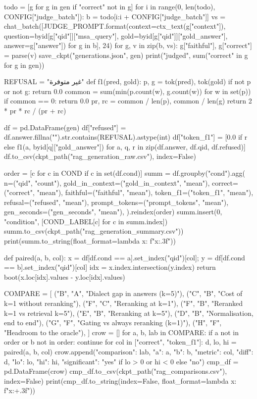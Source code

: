 {todo = [g for g in gen if "correct" not in g]
for i in range(0, len(todo), CONFIG["judge_batch"]):
    b = todo[i:i + CONFIG["judge_batch"]]
    vs = chat_batch([JUDGE_PROMPT.format(context=ctx_text(g["context"]), question=byid[g["qid"]]["msa_query"],
                                         gold=byid[g["qid"]]["gold_answer"], answer=g["answer"]) for g in b], 24)
    for g, v in zip(b, vs):
        g["faithful"], g["correct"] = parse(v)
    save_ckpt("generations.json", gen)
print("judged", sum("correct" in g for g in gen))

REFUSAL = "غير متوفرة"
def f1(pred, gold):
    p, g = tok(pred), tok(gold)
    if not p or not g:
        return 0.0
    common = sum(min(p.count(w), g.count(w)) for w in set(p))
    if common == 0:
        return 0.0
    pr, rc = common / len(p), common / len(g)
    return 2 * pr * rc / (pr + rc)

df = pd.DataFrame(gen)
df["refused"] = df.answer.fillna("").str.contains(REFUSAL).astype(int)
df["token_f1"] = [0.0 if r else f1(a, byid[q]["gold_answer"]) for a, q, r in zip(df.answer, df.qid, df.refused)]
df.to_csv(ckpt_path("rag_generation_raw.csv"), index=False)

order = [c for c in COND if c in set(df.cond)]
summ = df.groupby("cond").agg(
    n=("qid", "count"), gold_in_context=("gold_in_context", "mean"),
    correct=("correct", "mean"), faithful=("faithful", "mean"),
    token_f1=("token_f1", "mean"), refusal=("refused", "mean"),
    prompt_tokens=("prompt_tokens", "mean"), gen_seconds=("gen_seconds", "mean"),
).reindex(order)
summ.insert(0, "condition", [COND_LABEL[c] for c in summ.index])
summ.to_csv(ckpt_path("rag_generation_summary.csv"))
print(summ.to_string(float_format=lambda x: f"{x:.3f}"))

def paired(a, b, col):
    x = df[df.cond == a].set_index("qid")[col]; y = df[df.cond == b].set_index("qid")[col]
    idx = x.index.intersection(y.index)
    return boot(x.loc[idx].values - y.loc[idx].values)

COMPARE = [
    ("B", "A", "Dialect gap in answers (k=5)"),
    ("C", "B", "Cost of k=1 without reranking"),
    ("F", "C", "Reranking at k=1"),
    ("F", "B", "Reranked k=1 vs retrieval k=5"),
    ("E", "B", "Reranking at k=5"),
    ("D", "B", "Normalisation, end to end"),
    ("G", "F", "Gating vs always reranking (k=1)"),
    ("H", "F", "Headroom to the oracle"),
]
crow = []
for a, b, lab in COMPARE:
    if a not in order or b not in order:
        continue
    for col in ["correct", "token_f1"]:
        d, lo, hi = paired(a, b, col)
        crow.append({"comparison": lab, "a": a, "b": b, "metric": col, "diff": d, "lo": lo, "hi": hi,
                     "significant": "yes" if lo > 0 or hi < 0 else "no"})
cmp_df = pd.DataFrame(crow)
cmp_df.to_csv(ckpt_path("rag_comparisons.csv"), index=False)
print(cmp_df.to_string(index=False, float_format=lambda x: f"{x:+.3f}"))

}
